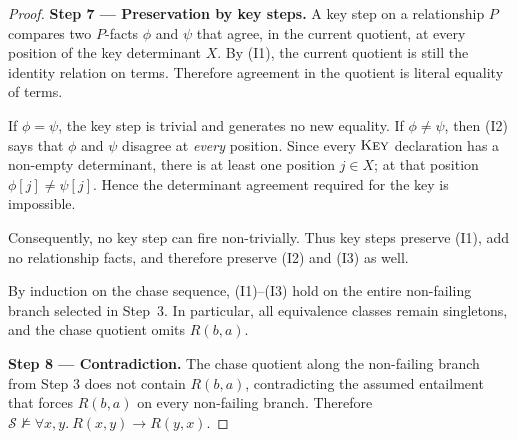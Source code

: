 \documentclass[10pt]{article}
\begin{document}
\begin{proof}
\smallskip\noindent\textbf{Step 7 --- Preservation by key steps.}
A key step on a relationship \(P\) compares two \(P\)-facts
\(\phi\) and \(\psi\) that agree, in the current quotient, at every
position of the key determinant \(X\).  By (I1), the current quotient
is still the identity relation on terms.  Therefore agreement in the
quotient is literal equality of terms.

If \(\phi=\psi\), the key step is trivial and generates no new
equality.  If \(\phi\neq\psi\), then (I2) says that \(\phi\) and
\(\psi\) disagree at \emph{every} position.  Since every
\(\textsc{Key}\) declaration has a non-empty determinant, there is at
least one position \(j\in X\); at that position
\(\phi[j]\neq\psi[j]\).  Hence the determinant agreement required
for the key is impossible.

Consequently, no key step can fire non-trivially.  Thus key steps
preserve (I1), add no relationship facts, and therefore preserve
(I2) and (I3) as well.

By induction on the chase sequence, (I1)--(I3) hold on the entire
non-failing branch selected in Step~3.  In particular, all
equivalence classes remain singletons, and the chase quotient omits
\(R(b,a)\).

\smallskip\noindent\textbf{Step 8 --- Contradiction.}
The chase quotient along the non-failing branch from Step 3 does
not contain \(R(b,a)\), contradicting the assumed entailment that
forces \(R(b,a)\) on every non-failing branch.  Therefore
\(\mathcal S\not\models\forall x,y.\ R(x,y)\to R(y,x)\).
\end{proof}
\end{document}

